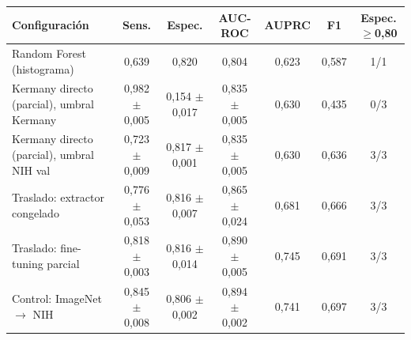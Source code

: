 \begin{tabular}{lcccccc}
\toprule
Configuración & Sens. & Espec. & AUC-ROC & AUPRC & F1 & Espec.$\geq$0,80 \\
\midrule
Random Forest (histograma) & 0{,}639 & 0{,}820 & 0{,}804 & 0{,}623 & 0{,}587 & 1/1 \\
Kermany directo (parcial), umbral Kermany & 0{,}982 $\pm$ 0{,}005 & 0{,}154 $\pm$ 0{,}017 & 0{,}835 $\pm$ 0{,}005 & 0{,}630 & 0{,}435 & 0/3 \\
Kermany directo (parcial), umbral NIH val & 0{,}723 $\pm$ 0{,}009 & 0{,}817 $\pm$ 0{,}001 & 0{,}835 $\pm$ 0{,}005 & 0{,}630 & 0{,}636 & 3/3 \\
Traslado: extractor congelado & 0{,}776 $\pm$ 0{,}053 & 0{,}816 $\pm$ 0{,}007 & 0{,}865 $\pm$ 0{,}024 & 0{,}681 & 0{,}666 & 3/3 \\
Traslado: fine-tuning parcial & 0{,}818 $\pm$ 0{,}003 & 0{,}816 $\pm$ 0{,}014 & 0{,}890 $\pm$ 0{,}005 & 0{,}745 & 0{,}691 & 3/3 \\
Control: ImageNet $\to$ NIH & 0{,}845 $\pm$ 0{,}008 & 0{,}806 $\pm$ 0{,}002 & 0{,}894 $\pm$ 0{,}002 & 0{,}741 & 0{,}697 & 3/3 \\
\bottomrule
\end{tabular}
